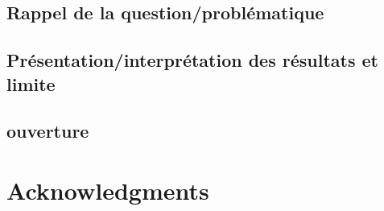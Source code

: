 \documentclass[fleqn,10pt]{SelfArx} %
\begin{document}
\subsection{Rappel de la question/problématique}
\subsection{Présentation/interprétation des résultats et limite}
\subsection{ouverture}

\section*{Acknowledgments} %






\end{document}
